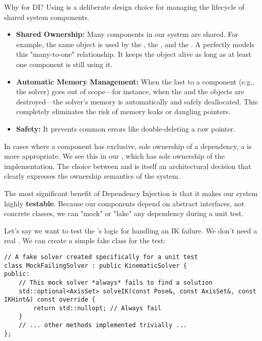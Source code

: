 \begin{tipbox}{Why  for DI?}
Using  is a deliberate design choice for managing the lifecycle of shared system components.
\begin{itemize}
    \item \textbf{Shared Ownership:} Many components in our system are shared. For example, the same  object is used by the , the , and the . A  perfectly models this "many-to-one" relationship. It keeps the object alive as long as at least one component is still using it.
    \item \textbf{Automatic Memory Management:} When the last  to a component (e.g., the solver) goes out of scope—for instance, when the  and the  objects are destroyed—the solver's memory is automatically and safely deallocated. This completely eliminates the risk of memory leaks or dangling pointers.
    \item \textbf{Safety:} It prevents common errors like double-deleting a raw pointer.
\end{itemize}

In cases where a component has exclusive, sole ownership of a dependency, a  is more appropriate. We see this in our , which has sole ownership of the  implementation. The choice between  and  is itself an architectural decision that clearly expresses the ownership semantics of the system.
\end{tipbox}


The most significant benefit of Dependency Injection is that it makes our system highly \textbf{testable}. Because our components depend on abstract interfaces, not concrete classes, we can "mock" or "fake" any dependency during a unit test.

Let's say we want to test the 's logic for handling an IK failure. We don't need a real . We can create a simple fake class for the test:

\begin{verbatim}
// A fake solver created specifically for a unit test
class MockFailingSolver : public KinematicSolver {
public:
    // This mock solver *always* fails to find a solution
    std::optional<AxisSet> solveIK(const Pose&, const AxisSet&, const IKHint&) const override {
        return std::nullopt; // Always fail
    }
    // ... other methods implemented trivially ...
};
\end{verbatim}
\label{fig:mock-solver}

